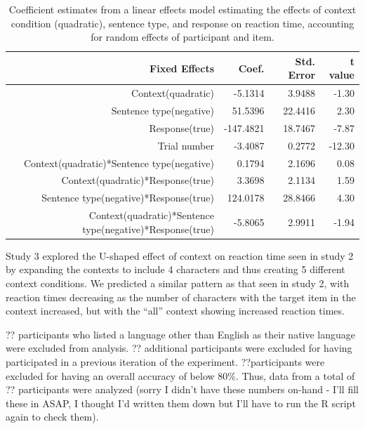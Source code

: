 \documentclass[10pt,letterpaper]{article}
\begin{document}
\begin{table}[t]
\caption{Coefficient estimates from a linear effects model estimating the effects of context condition (quadratic), sentence type, and response on reaction time, accounting for random effects of participant and item.}
\begin{center}
\small\addtolength{\tabcolsep}{-5pt}
\begin{tabular}{ r  r  r  r  } 
\hline
  \bf{Fixed Effects} & \bf{Coef.} & \bf{Std. Error} & \bf{t value} \\ \hline                     
Context(quadratic) & -5.1314   &  3.9488  & -1.30\\
Sentence type(negative) & 51.5396 &   22.4416   & 2.30\\
Response(true) & -147.4821  &  18.7467 &  -7.87\\
Trial number &-3.4087 &    0.2772 &  -12.30 \\
Context(quadratic)*Sentence type(negative)&  0.1794  &   2.1696  &  0.08\\
Context(quadratic)*Response(true) &  3.3698 &    2.1134  &  1.59 \\
Sentence type(negative)*Response(true) &124.0178 &   28.8466 &   4.30  \\
Context(quadratic)*Sentence type(negative)*Response(true) & -5.8065  &   2.9911  & -1.94\\
\hline
\end{tabular}
\end{center}
\end{table}

Study 3 explored the U-shaped effect of context on reaction time seen in study 2 by expanding the contexts to include 4 characters and thus creating 5 different context conditions.  We predicted a similar pattern as that seen in study 2, with reaction times decreasing as the number of characters with the target item in the context increased, but with the ``all'' context showing increased reaction times.  

?? participants who listed a language other than English as their native language were excluded from analysis.  ?? additional participants were excluded for having participated in a previous iteration of the experiment.  ??participants were excluded for having an overall accuracy of below 80\%.  Thus, data from a total of ?? participants were analyzed (sorry I didn't have these numbers on-hand - I'll fill these in ASAP, I thought I'd written them down but I'll have to run the R script again to check them).  
\end{document}

